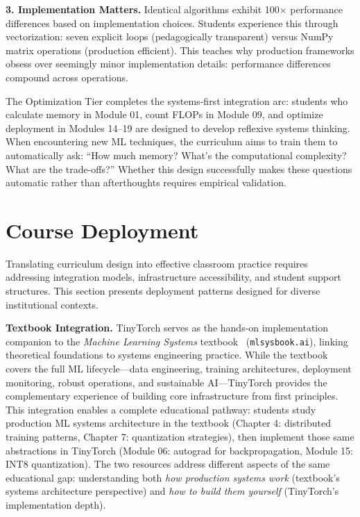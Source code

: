 \documentclass[10pt,twocolumn]{article}
\begin{document}
\textbf{3. Implementation Matters.} Identical algorithms exhibit 100$\times$ performance differences based on implementation choices. Students experience this through vectorization: seven explicit loops (pedagogically transparent) versus NumPy matrix operations (production efficient). This teaches why production frameworks obsess over seemingly minor implementation details: performance differences compound across operations.

The Optimization Tier completes the systems-first integration arc: students who calculate memory in Module 01, count FLOPs in Module 09, and optimize deployment in Modules 14--19 are designed to develop reflexive systems thinking. When encountering new ML techniques, the curriculum aims to train them to automatically ask: ``How much memory? What's the computational complexity? What are the trade-offs?'' Whether this design successfully makes these questions automatic rather than afterthoughts requires empirical validation.

\section{Course Deployment}
\label{sec:deployment}

Translating curriculum design into effective classroom practice requires addressing integration models, infrastructure accessibility, and student support structures. This section presents deployment patterns designed for diverse institutional contexts.

\textbf{Textbook Integration.}
TinyTorch serves as the hands-on implementation companion to the \emph{Machine Learning Systems} textbook~\citep{mlsysbook2025} (\texttt{mlsysbook.ai}), linking theoretical foundations to systems engineering practice. While the textbook covers the full ML lifecycle---data engineering, training architectures, deployment monitoring, robust operations, and sustainable AI---TinyTorch provides the complementary experience of building core infrastructure from first principles. This integration enables a complete educational pathway: students study production ML systems architecture in the textbook (Chapter 4: distributed training patterns, Chapter 7: quantization strategies), then implement those same abstractions in TinyTorch (Module 06: autograd for backpropagation, Module 15: INT8 quantization). The two resources address different aspects of the same educational gap: understanding both \emph{how production systems work} (textbook's systems architecture perspective) and \emph{how to build them yourself} (TinyTorch's implementation depth).
\end{document}

